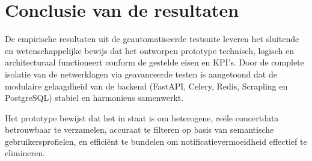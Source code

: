 \section{Conclusie van de resultaten}
\label{sec:conclusie-resultaten}

De empirische resultaten uit de geautomatiseerde testsuite 
leveren het sluitende en wetenschappelijke bewijs dat het ontworpen 
prototype technisch, logisch en architecturaal functioneert conform 
de gestelde eisen en KPI's. Door de complete isolatie van de netwerklagen 
via geavanceerde testen is aangetoond dat 
de modulaire gelaagdheid van de backend (FastAPI, Celery, Redis, 
Scrapling en PostgreSQL) stabiel en harmonieus samenwerkt. 

Het prototype bewijst dat het in staat is om heterogene, reële 
concertdata betrouwbaar te verzamelen, accuraat te filteren op basis 
van semantische gebruikersprofielen, en efficiënt te bundelen om 
notificatievermoeidheid effectief te elimineren.